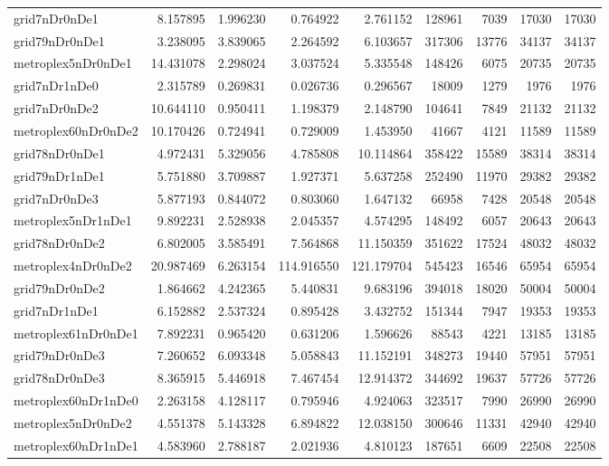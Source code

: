 \begin{longtable}{|l|r|r|r|r|r|r|r|r|}
grid7nDr0nDe1 & 8.157895 & 1.996230 & 0.764922 & 2.761152 & 128961 & 7039 & 17030 & 17030 \\
grid79nDr0nDe1 & 3.238095 & 3.839065 & 2.264592 & 6.103657 & 317306 & 13776 & 34137 & 34137 \\
metroplex5nDr0nDe1 & 14.431078 & 2.298024 & 3.037524 & 5.335548 & 148426 & 6075 & 20735 & 20735 \\
grid7nDr1nDe0 & 2.315789 & 0.269831 & 0.026736 & 0.296567 & 18009 & 1279 & 1976 & 1976 \\
grid7nDr0nDe2 & 10.644110 & 0.950411 & 1.198379 & 2.148790 & 104641 & 7849 & 21132 & 21132 \\
metroplex60nDr0nDe2 & 10.170426 & 0.724941 & 0.729009 & 1.453950 & 41667 & 4121 & 11589 & 11589 \\
grid78nDr0nDe1 & 4.972431 & 5.329056 & 4.785808 & 10.114864 & 358422 & 15589 & 38314 & 38314 \\
grid79nDr1nDe1 & 5.751880 & 3.709887 & 1.927371 & 5.637258 & 252490 & 11970 & 29382 & 29382 \\
grid7nDr0nDe3 & 5.877193 & 0.844072 & 0.803060 & 1.647132 & 66958 & 7428 & 20548 & 20548 \\
metroplex5nDr1nDe1 & 9.892231 & 2.528938 & 2.045357 & 4.574295 & 148492 & 6057 & 20643 & 20643 \\
grid78nDr0nDe2 & 6.802005 & 3.585491 & 7.564868 & 11.150359 & 351622 & 17524 & 48032 & 48032 \\
metroplex4nDr0nDe2 & 20.987469 & 6.263154 & 114.916550 & 121.179704 & 545423 & 16546 & 65954 & 65954 \\
grid79nDr0nDe2 & 1.864662 & 4.242365 & 5.440831 & 9.683196 & 394018 & 18020 & 50004 & 50004 \\
grid7nDr1nDe1 & 6.152882 & 2.537324 & 0.895428 & 3.432752 & 151344 & 7947 & 19353 & 19353 \\
metroplex61nDr0nDe1 & 7.892231 & 0.965420 & 0.631206 & 1.596626 & 88543 & 4221 & 13185 & 13185 \\
grid79nDr0nDe3 & 7.260652 & 6.093348 & 5.058843 & 11.152191 & 348273 & 19440 & 57951 & 57951 \\
grid78nDr0nDe3 & 8.365915 & 5.446918 & 7.467454 & 12.914372 & 344692 & 19637 & 57726 & 57726 \\
metroplex60nDr1nDe0 & 2.263158 & 4.128117 & 0.795946 & 4.924063 & 323517 & 7990 & 26990 & 26990 \\
metroplex5nDr0nDe2 & 4.551378 & 5.143328 & 6.894822 & 12.038150 & 300646 & 11331 & 42940 & 42940 \\
metroplex60nDr1nDe1 & 4.583960 & 2.788187 & 2.021936 & 4.810123 & 187651 & 6609 & 22508 & 22508 \\

\end{longtable}
